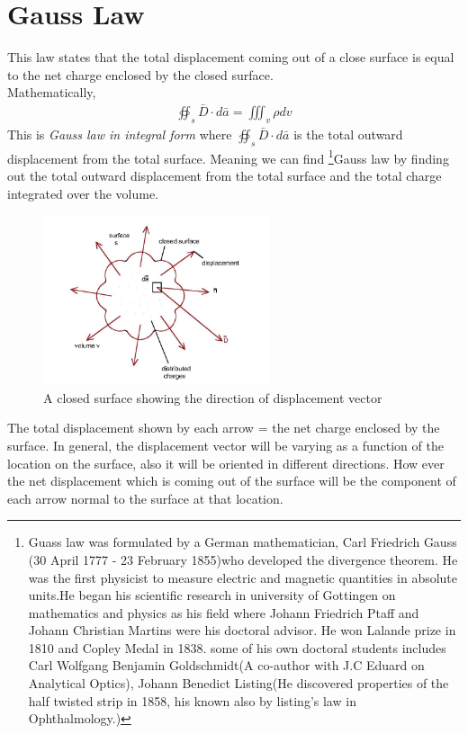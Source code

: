 \section{Gauss Law}
This law states that the total displacement coming out of a close surface is equal to the net charge enclosed by the closed surface.\\
Mathematically, 
\begin{align}
\boxed{\oiint_s\bar{D}\cdot{d\bar{a}} = \iiint_v\rho dv}
\end{align}
This is  \emph{Gauss law in integral form} where $\oiint_s\bar{D}\cdot d\bar{a}$ is the total outward displacement from the total surface. Meaning we can find \footnote[5]{Guass law was formulated by a German mathematician, Carl Friedrich Gauss (30 April 1777 - 23 February 1855)who developed the divergence theorem. He was the first physicist to measure  electric  and magnetic  quantities in absolute  units.He began his scientific research in university of Gottingen on mathematics and physics as his field where Johann Friedrich Ptaff and Johann Christian Martins were his doctoral advisor. He won Lalande prize in 1810 and Copley Medal in 1838. some of his own doctoral students includes Carl Wolfgang Benjamin Goldschmidt(A co-author with J.C Eduard on Analytical Optics), Johann Benedict Listing(He discovered properties of the half twisted strip in 1858, his known also by listing's law in Ophthalmology.)}Gauss law by finding out the total outward displacement from the total surface and the total charge integrated over the volume.
\begin{figure}[h]
\centering
\includegraphics[height=5cm]{./graphics/g}
\caption{A closed surface showing the direction of displacement vector}
\label{fig:g}
\end{figure}

The total displacement shown by each arrow = the net charge enclosed by the surface. In general, the displacement vector will be varying as a function of the location on the surface, also it will be oriented in different directions. How ever the net displacement which is coming out of the surface will be the component of each arrow normal to the surface at that location.

